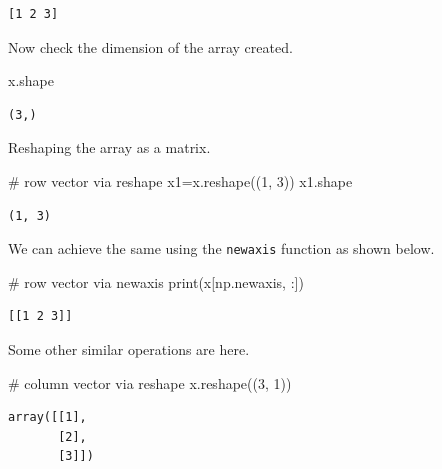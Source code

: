 \documentclass[
  letterpaper,
  DIV=11,
  numbers=noendperiod]{scrreprt}
\newenvironment{Shaded}{\begin{snugshade}}{\end{snugshade}}
\newcommand{\BuiltInTok}[1]{\textcolor[rgb]{0.00,0.23,0.31}{#1}}
\newcommand{\CommentTok}[1]{\textcolor[rgb]{0.37,0.37,0.37}{#1}}
\newcommand{\DecValTok}[1]{\textcolor[rgb]{0.68,0.00,0.00}{#1}}
\newcommand{\NormalTok}[1]{\textcolor[rgb]{0.00,0.23,0.31}{#1}}
\newcommand{\OperatorTok}[1]{\textcolor[rgb]{0.37,0.37,0.37}{#1}}
\theoremstyle{plain}
\theoremstyle{definition}
\theoremstyle{remark}
\begin{document}
\begin{verbatim}
[1 2 3]
\end{verbatim}

Now check the dimension of the array created.

\begin{Shaded}
\begin{Highlighting}[]
\NormalTok{x.shape}
\end{Highlighting}
\end{Shaded}

\begin{verbatim}
(3,)
\end{verbatim}

Reshaping the array as a matrix.

\begin{Shaded}
\begin{Highlighting}[]
\CommentTok{\# row vector via reshape}
\NormalTok{x1}\OperatorTok{=}\NormalTok{x.reshape((}\DecValTok{1}\NormalTok{, }\DecValTok{3}\NormalTok{))}
\NormalTok{x1.shape}
\end{Highlighting}
\end{Shaded}

\begin{verbatim}
(1, 3)
\end{verbatim}

We can achieve the same using the \texttt{newaxis} function as shown
below.

\begin{Shaded}
\begin{Highlighting}[]
\CommentTok{\# row vector via newaxis}
\BuiltInTok{print}\NormalTok{(x[np.newaxis, :])}
\end{Highlighting}
\end{Shaded}

\begin{verbatim}
[[1 2 3]]
\end{verbatim}

Some other similar operations are here.

\begin{Shaded}
\begin{Highlighting}[]
\CommentTok{\# column vector via reshape}
\NormalTok{x.reshape((}\DecValTok{3}\NormalTok{, }\DecValTok{1}\NormalTok{))}
\end{Highlighting}
\end{Shaded}

\begin{verbatim}
array([[1],
       [2],
       [3]])
\end{verbatim}
\end{document}
